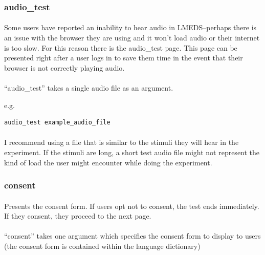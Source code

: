 \documentclass[12pt, oneside]{scrbook}   	%
\begin{document}
\subsubsection{audio\_test}

\paragraph{}
Some users have reported an inability to hear audio in LMEDS--perhaps there is an issue with the browser they are using and it won't load audio or their internet is too slow.  For this reason there is the audio\_test page.  This page can be presented right after a user logs in to save them time in the event that their browser is not correctly playing audio.

\paragraph{}
``audio\_test'' takes a single audio file as an argument.

e.g.

\begin{lstlisting}
audio_test example_audio_file
\end{lstlisting}

\paragraph{}
I recommend using a file that is similar to the stimuli they will hear in the experiment.  If the stimuli are long, a short test audio file might not represent the kind of load the user might encounter while doing the experiment.

\subsubsection{consent}

\paragraph{}
Presents the consent form.  If users opt not to consent, the test ends immediately.  If they consent, they proceed to the next page.

\paragraph{}
``consent'' takes one argument which specifies the consent form to display to users (the consent form is contained within the language dictionary)
\end{document}

